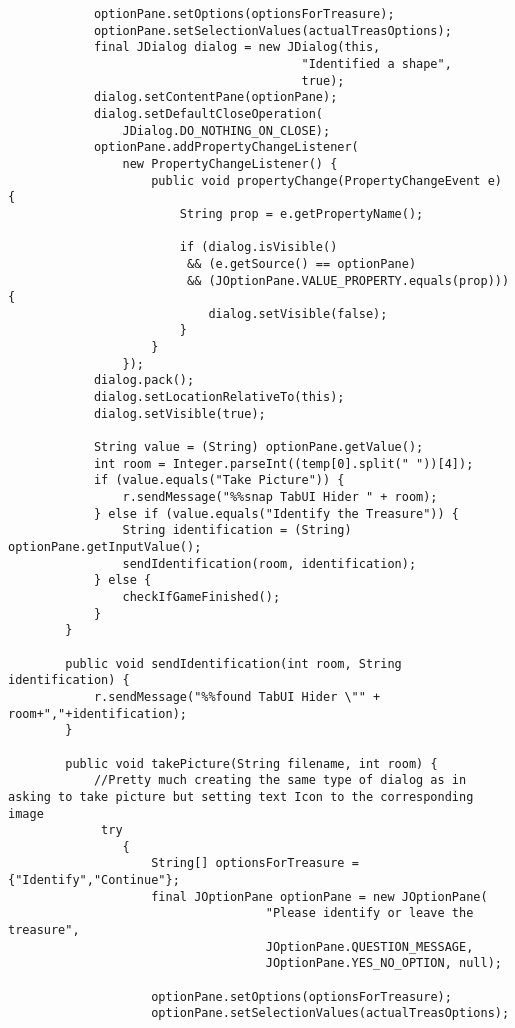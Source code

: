 \begin{lstlisting}
			optionPane.setOptions(optionsForTreasure);
			optionPane.setSelectionValues(actualTreasOptions);
            final JDialog dialog = new JDialog(this,
                                         "Identified a shape",
                                         true);
            dialog.setContentPane(optionPane);
            dialog.setDefaultCloseOperation(
                JDialog.DO_NOTHING_ON_CLOSE);
            optionPane.addPropertyChangeListener(
                new PropertyChangeListener() {
                    public void propertyChange(PropertyChangeEvent e) {
                        String prop = e.getPropertyName();

                        if (dialog.isVisible()
                         && (e.getSource() == optionPane)
                         && (JOptionPane.VALUE_PROPERTY.equals(prop))) {
                            dialog.setVisible(false);
                        }
                    }
                });
            dialog.pack();
            dialog.setLocationRelativeTo(this);
            dialog.setVisible(true);

            String value = (String) optionPane.getValue();
            int room = Integer.parseInt((temp[0].split(" "))[4]);
            if (value.equals("Take Picture")) {
                r.sendMessage("%%snap TabUI Hider " + room);
            } else if (value.equals("Identify the Treasure")) {
            	String identification = (String) optionPane.getInputValue();
                sendIdentification(room, identification);
            } else {
            	checkIfGameFinished();
            }
		}

		public void sendIdentification(int room, String identification) {
			r.sendMessage("%%found TabUI Hider \"" + room+","+identification);
		}

		public void takePicture(String filename, int room) {
			//Pretty much creating the same type of dialog as in asking to take picture but setting text Icon to the corresponding image
			 try
                {
                	String[] optionsForTreasure = {"Identify","Continue"};
                	final JOptionPane optionPane = new JOptionPane(
                                    "Please identify or leave the treasure",
                                    JOptionPane.QUESTION_MESSAGE,
                                    JOptionPane.YES_NO_OPTION, null);

                	optionPane.setOptions(optionsForTreasure);
					optionPane.setSelectionValues(actualTreasOptions);


\end{lstlisting}

